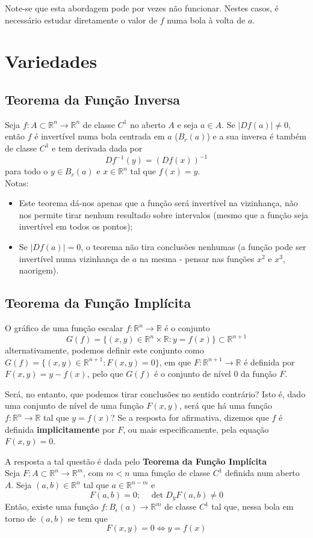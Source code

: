 \documentclass{article}
\newcommand{\R}{\mathbb{R}}
\begin{document}
Note-se que esta abordagem pode por vezes não funcionar. Nestes casos, é necessário estudar diretamente o valor de $f$ numa bola à volta de $a$.

\section{Variedades}
\subsection{Teorema da Função Inversa}
Seja $f:A \subset \R^n \to \R^n$ de classe $C^1$ no aberto $A$ e seja $a \in A$. Se $|Df(a)| \neq 0$, então $f$ é invertível numa bola centrada em $a$ ($B_r(a)$) e a sua inversa é também de classe $C^1$ e tem derivada dada por
$$
Df^{-1}(y) = \left( Df(x) \right)^{-1}
$$
para todo o $y \in B_r(a)$ e $x \in \R^n$ tal que $f(x) = y$.\\
Notas:
\begin{itemize}
    \item Este teorema dá-nos apenas que a função será invertível na vizinhança, não nos permite tirar nenhum resultado sobre intervalos (mesmo que a função seja invertível em todos os pontos);
    \item Se $|Df(a)|=0$, o teorema não tira conclusões nenhumas (a função pode ser invertível numa vizinhança de $a$ na mesma - pensar nas funções $x^2$ e $x^3$, naorigem).
\end{itemize}

\subsection{Teorema da Função Implícita}
O gráfico de uma função escalar $f: \R^n \to \R$ é o conjunto
$$ G(f) = \{(x,y) \in \R^n \times \R: y = f(x) \} \subset \R^{n+1} $$
alternativamente, podemos definir este conjunto como $G(f) = \{(x,y) \in \R^{n+1}: F(x,y) = 0 \}$, em que $F: \R^{n+1} \to \R$ é definida por $F(x,y) = y - f(x)$, pelo que $G(f)$ é o conjunto de nível 0 da função $F$.

Será, no entanto, que podemos tirar conclusões no sentido contrário? Isto é, dado uma conjunto de nível de uma função $F(x,y)$, será que há uma função $f: \R^n \to \R$ tal que $y = f(x)$? Se a resposta for afirmativa, dizemos que $f$ é definida \textbf{implicitamente} por $F$, ou mais especificamente, pela equação $F(x,y) = 0$.

A resposta a tal questão é dada pelo \textbf{Teorema da Função Implícita}\\
Seja $F: A \subset \R^n \to \R^m$, com $m<n$ uma função de classe $C^1$ definida num aberto $A$. Seja $(a,b) \in \R^n$ tal que $a \in \R^{n-m}$ e 
$$
F(a,b) = 0; \quad \det D_yF(a,b) \neq 0
$$
Então, existe uma função $f: B_\epsilon(a) \to \R^m$ de classe $C^1$ tal que, nessa bola em torno de $(a,b)$ se tem que 
$$
F(x,y) = 0 \Leftrightarrow y = f(x)
$$
\end{document}
